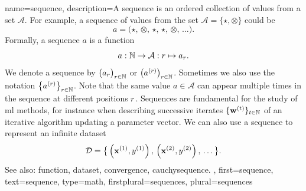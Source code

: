 {name={sequence},
	description={A sequence is an ordered collection 
		of values from a set $\mathcal{A}$. For example, a sequence of 
	   	values from the set $\mathcal{A} = \{ \star, \otimes \}$ could be 
	   	$$ a = \big( \star, \,\otimes, \,\star, \,\star, \,\otimes, \,\ldots \big). $$
	   	Formally, a sequence $a$ is a \gls{function} \cite{RudinBookPrinciplesMatheAnalysis} 
        		\[
            	a: \mathbb{N} \rightarrow \mathcal{A}: r \mapsto a_r.
        		\]        
		We denote a sequence by $\big( a_{r} \big)_{r \in \mathbb{N}}$ 
		or $\big( a^{(r)} \big)_{r \in \mathbb{N}}$. Sometimes we also 
		use the notation $\big\{ a^{(r)} \big\}_{r \in \mathbb{N}}$. 
        		Note that the same value $a \in \mathcal{A}$ can appear multiple times 
		in the sequence at different positions $r$. 		
        		Sequences are fundamental for the study of \gls{ml} methods, 
        		for instance when describing successive iterates  
        		$\{{\bf w}^{(t)}\}_{t \in \mathbb{N}}$ of an iterative 
		\gls{algorithm} updating a \gls{parameter} \gls{vector}. 
		We can also use a sequence to represent an infinite \gls{dataset} 
		$$\mathcal{D} = \big\{ \left( {\bf x}^{(1)},y^{(1)} \right),\,\left( {\bf x}^{(2)},y^{(2)} \right),\,\ldots \big\}.$$ 
		See also: \gls{function}, \gls{dataset}, \gls{convergence}, \gls{cauchysequence}. }, 
	first={sequence},
	text={sequence},
	type=math, 
	firstplural={sequences},
	plural={sequences}
}

